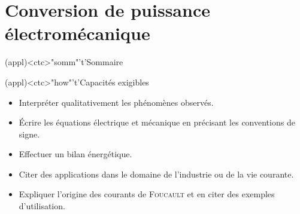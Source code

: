 \documentclass[../../main/main.tex]{subfiles}
\begin{document}
\setcounter{chapter}{3}


\chapter{Conversion de puissance électromécanique}
\label{ch:convelecmeca}

\vspace*{\fill}

\begin{tcn}(appl)<ctc>"somm"'t'{Sommaire}
	\let\item\olditem
	\vspace{-15pt}
	\minitoc
	\vspace{-25pt}
\end{tcn}

\begin{tcn}[fontupper=\small](appl)<ctc>"how"'t'{Capacités exigibles}
	\begin{itemize}[label=\rcheck]
		\item Interpréter qualitativement les phénomènes observés.
		\item Écrire les équations électrique et mécanique en précisant les
		      conventions de signe.
		\item Effectuer un bilan énergétique.
		\item Citer des applications dans le domaine de l'industrie ou de la vie
		      courante.
		\item Expliquer l'origine des courants de \textsc{Foucault} et en citer des
		      exemples d'utilisation.
	\end{itemize}
\end{tcn}

\vspace{-15pt}
\end{document}
